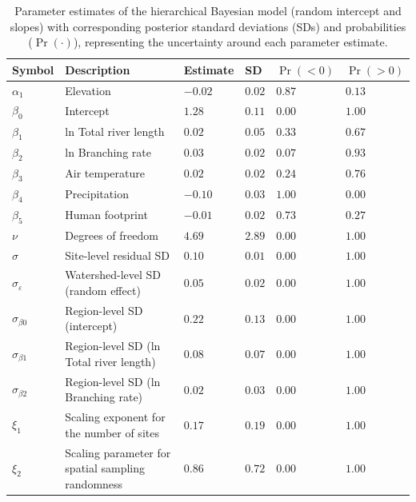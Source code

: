 \begin{table}[ht]
\centering
\caption{Parameter estimates of the hierarchical Bayesian model (random intercept and slopes) with corresponding posterior standard deviations (SDs) and probabilities ($\Pr(\cdot)$), representing the uncertainty around each parameter estimate.} 
\label{tab:parms-est2}
\begingroup\small
\begin{tabularx}{\textwidth}{llllll}
  \hline
Symbol & Description & Estimate & SD & $\Pr(< 0)$ & $\Pr(> 0)$ \\ 
  \hline
$\alpha_1$ & Elevation & $-0.02$ & $0.02$ & $0.87$ & $0.13$ \\ 
  $\beta_0$ & Intercept & $1.28$ & $0.11$ & $0.00$ & $1.00$ \\ 
  $\beta_1$ & ln Total river length & $0.02$ & $0.05$ & $0.33$ & $0.67$ \\ 
  $\beta_2$ & ln Branching rate & $0.03$ & $0.02$ & $0.07$ & $0.93$ \\ 
  $\beta_3$ & Air temperature & $0.02$ & $0.02$ & $0.24$ & $0.76$ \\ 
  $\beta_4$ & Precipitation & $-0.10$ & $0.03$ & $1.00$ & $0.00$ \\ 
  $\beta_5$ & Human footprint & $-0.01$ & $0.02$ & $0.73$ & $0.27$ \\ 
  $\nu$ & Degrees of freedom & $4.69$ & $2.89$ & $0.00$ & $1.00$ \\ 
  $\sigma$ & Site-level residual SD & $0.10$ & $0.01$ & $0.00$ & $1.00$ \\ 
  $\sigma_{\varepsilon}$ & Watershed-level SD (random effect) & $0.05$ & $0.02$ & $0.00$ & $1.00$ \\ 
  $\sigma_{\beta0}$ & Region-level SD (intercept) & $0.22$ & $0.13$ & $0.00$ & $1.00$ \\ 
  $\sigma_{\beta1}$ & Region-level SD (ln Total river length) & $0.08$ & $0.07$ & $0.00$ & $1.00$ \\ 
  $\sigma_{\beta2}$ & Region-level SD (ln Branching rate) & $0.02$ & $0.03$ & $0.00$ & $1.00$ \\ 
  $\xi_{1}$ & Scaling exponent for the number of sites & $0.17$ & $0.19$ & $0.00$ & $1.00$ \\ 
  $\xi_{2}$ & Scaling parameter for spatial sampling randomness & $0.86$ & $0.72$ & $0.00$ & $1.00$ \\ 
   \hline
\end{tabularx}
\endgroup
\end{table}
